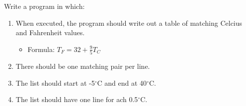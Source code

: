 Write a program in which:
\begin{enumerate}
  \item When executed, the program should write out a table of matching Celcius and Fahrenheit values.
    \begin{itemize}
      \item Formula: $T_F = 32 + \frac{9}{5} T_C$
    \end{itemize}
  \item There should be one matching pair per line.
  \item The list should start at -5$^\circ$C and end at 40$^\circ$C.
  \item The list should have one line for ach 0.5$^\circ$C.
\end{enumerate}
